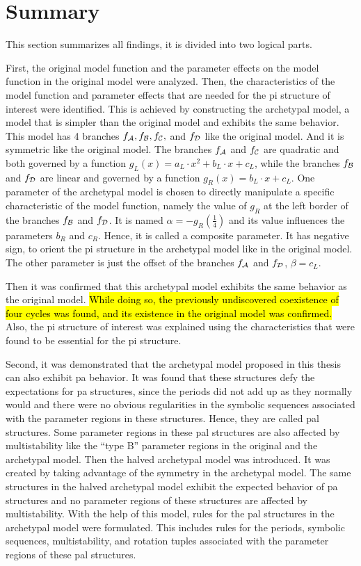 \section{Summary}
\label{sec:concl.sum}

This section summarizes all findings, it is divided into two logical parts.

First, the original model function and the parameter effects on the model function in the original model were analyzed.
Then, the characteristics of the model function and parameter effects that are needed for the \gls{pi} structure of interest were identified.
This is achieved by constructing the archetypal model, a model that is simpler than the original model and exhibits the same behavior.
This model has 4 branches $f_{\mathcal{A}}, f_{\mathcal{B}}, f_{\mathcal{C}},$ and $f_{\mathcal{D}}$ like the original model.
And it is symmetric like the original model.
The branches $f_{\mathcal{A}}$ and $f_{\mathcal{C}}$ are quadratic and both governed by a function $g_L(x) = a_L \cdot x^2 + b_L \cdot x + c_L$, while the branches $f_{\mathcal{B}}$ and $f_{\mathcal{D}}$ are linear and governed by a function $g_R(x) = b_L \cdot x + c_L$.
One parameter of the archetypal model is chosen to directly manipulate a specific characteristic of the model function, namely the value of $g_R$ at the left border of the branches $f_{\mathcal{B}}$ and $f_{\mathcal{D}}$.
It is named $\alpha = -g_R\left(\frac{1}{4}\right)$ and its value influences the parameters $b_R$ and $c_R$.
Hence, it is called a composite parameter.
It has negative sign, to orient the \gls{pi} structure in the archetypal model like in the original model.
The other parameter is just the offset of the branches $f_{\mathcal{A}}$ and $f_{\mathcal{D}}$, $\beta = c_L$.

Then it was confirmed that this archetypal model exhibits the same behavior as the original model.
\hl{
	While doing so, the previously undiscovered coexistence of four cycles was found, and its existence in the original model was confirmed.
}
Also, the \gls{pi} structure of interest was explained using the characteristics that were found to be essential for the \gls{pi} structure.

Second, it was demonstrated that the archetypal model proposed in this thesis can also exhibit \gls{pa} behavior.
It was found that these structures defy the expectations for \gls{pa} structures, since the periods did not add up as they normally would and there were no obvious regularities in the symbolic sequences associated with the parameter regions in these structures.
Hence, they are called \gls{pal} structures.
Some parameter regions in these \gls{pal} structures are also affected by multistability like the ``type B'' parameter regions in the original and the archetypal model.
Then the halved archetypal model was introduced.
It was created by taking advantage of the symmetry in the archetypal model.
The same structures in the halved archetypal model exhibit the expected behavior of \gls{pa} structures and no parameter regions of these structures are affected by multistability.
With the help of this model, rules for the \gls{pal} structures in the archetypal model were formulated.
This includes rules for the periods, symbolic sequences, multistability, and rotation tuples associated with the parameter regions of these \gls{pal} structures.
